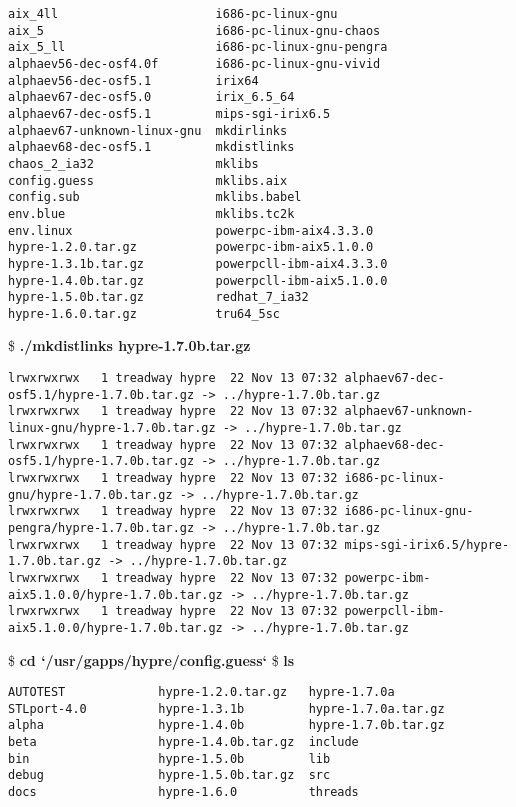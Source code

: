 \begin{ttfamily}
\begin{mdseries}
\begin{verbatim}
aix_4ll                      i686-pc-linux-gnu
aix_5                        i686-pc-linux-gnu-chaos
aix_5_ll                     i686-pc-linux-gnu-pengra
alphaev56-dec-osf4.0f        i686-pc-linux-gnu-vivid
alphaev56-dec-osf5.1         irix64
alphaev67-dec-osf5.0         irix_6.5_64
alphaev67-dec-osf5.1         mips-sgi-irix6.5
alphaev67-unknown-linux-gnu  mkdirlinks
alphaev68-dec-osf5.1         mkdistlinks
chaos_2_ia32                 mklibs
config.guess                 mklibs.aix
config.sub                   mklibs.babel
env.blue                     mklibs.tc2k
env.linux                    powerpc-ibm-aix4.3.3.0
hypre-1.2.0.tar.gz           powerpc-ibm-aix5.1.0.0
hypre-1.3.1b.tar.gz          powerpcll-ibm-aix4.3.3.0
hypre-1.4.0b.tar.gz          powerpcll-ibm-aix5.1.0.0
hypre-1.5.0b.tar.gz          redhat_7_ia32
hypre-1.6.0.tar.gz           tru64_5sc
\end{verbatim}
\$ \textbf{./mkdistlinks hypre-1.7.0b.tar.gz}\linebreak
\begin{verbatim}
lrwxrwxrwx   1 treadway hypre  22 Nov 13 07:32 alphaev67-dec-osf5.1/hypre-1.7.0b.tar.gz -> ../hypre-1.7.0b.tar.gz
lrwxrwxrwx   1 treadway hypre  22 Nov 13 07:32 alphaev67-unknown-linux-gnu/hypre-1.7.0b.tar.gz -> ../hypre-1.7.0b.tar.gz
lrwxrwxrwx   1 treadway hypre  22 Nov 13 07:32 alphaev68-dec-osf5.1/hypre-1.7.0b.tar.gz -> ../hypre-1.7.0b.tar.gz
lrwxrwxrwx   1 treadway hypre  22 Nov 13 07:32 i686-pc-linux-gnu/hypre-1.7.0b.tar.gz -> ../hypre-1.7.0b.tar.gz
lrwxrwxrwx   1 treadway hypre  22 Nov 13 07:32 i686-pc-linux-gnu-pengra/hypre-1.7.0b.tar.gz -> ../hypre-1.7.0b.tar.gz
lrwxrwxrwx   1 treadway hypre  22 Nov 13 07:32 mips-sgi-irix6.5/hypre-1.7.0b.tar.gz -> ../hypre-1.7.0b.tar.gz
lrwxrwxrwx   1 treadway hypre  22 Nov 13 07:32 powerpc-ibm-aix5.1.0.0/hypre-1.7.0b.tar.gz -> ../hypre-1.7.0b.tar.gz
lrwxrwxrwx   1 treadway hypre  22 Nov 13 07:32 powerpcll-ibm-aix5.1.0.0/hypre-1.7.0b.tar.gz -> ../hypre-1.7.0b.tar.gz
\end{verbatim}
\$ \textbf{cd `/usr/gapps/hypre/config.guess`}\linebreak
\$ \textbf{ls}\linebreak
\begin{verbatim}
AUTOTEST             hypre-1.2.0.tar.gz   hypre-1.7.0a
STLport-4.0          hypre-1.3.1b         hypre-1.7.0a.tar.gz
alpha                hypre-1.4.0b         hypre-1.7.0b.tar.gz
beta                 hypre-1.4.0b.tar.gz  include
bin                  hypre-1.5.0b         lib
debug                hypre-1.5.0b.tar.gz  src
docs                 hypre-1.6.0          threads

\end{verbatim}
\end{mdseries}
\end{ttfamily}
